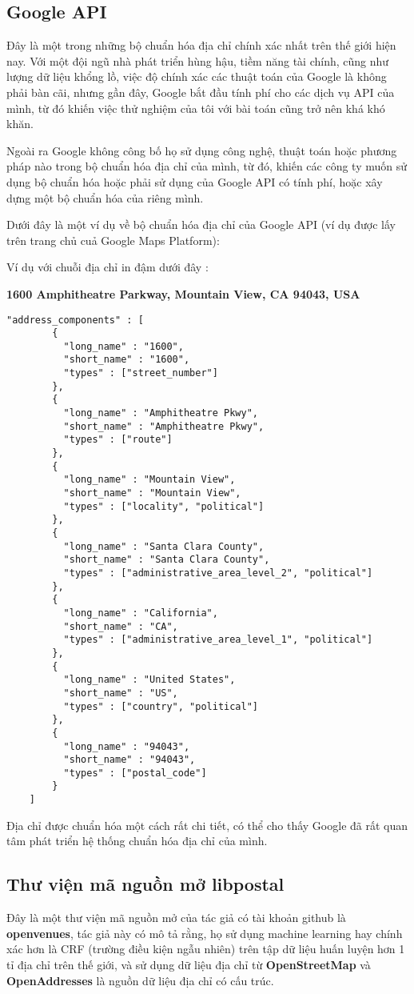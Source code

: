 \subsection{Google API}
 Đây là một trong những bộ chuẩn hóa địa chỉ chính xác nhất trên thế giới hiện nay. Với một đội ngũ nhà phát triển hùng hậu, tiềm năng tài chính, cũng như lượng dữ liệu khổng lồ, việc độ chính xác các thuật toán của Google là không phải bàn cãi, nhưng gần đây, Google bắt đầu tính phí cho các dịch vụ API của mình, từ đó khiến việc thử nghiệm của tôi với bài toán cũng trở nên khá khó khăn. 
 
 Ngoài ra Google không công bố họ sử dụng công nghệ, thuật toán hoặc phương pháp nào trong bộ chuẩn hóa địa chỉ của mình, từ đó, khiến các công ty muốn sử dụng bộ chuẩn hóa hoặc phải sử dụng của Google API có tính phí, hoặc xây dựng một bộ chuẩn hóa của riêng mình.
 
 Dưới đây là một ví dụ về bộ chuẩn hóa địa chỉ của Google API (ví dụ được lấy trên trang chủ cuả Google Maps Platform):
 
  \vspace*{1cm}
 Ví dụ với chuỗi địa chỉ in đậm dưới đây :
 
\textbf{1600 Amphitheatre Parkway, Mountain View, CA 94043, USA}
\newpage
\begin{lstlisting}
"address_components" : [
        {
          "long_name" : "1600",
          "short_name" : "1600",
          "types" : ["street_number"]
        },
        {
          "long_name" : "Amphitheatre Pkwy",
          "short_name" : "Amphitheatre Pkwy",
          "types" : ["route"]
        },
        {
          "long_name" : "Mountain View",
          "short_name" : "Mountain View",
          "types" : ["locality", "political"]
        },
        {
          "long_name" : "Santa Clara County",
          "short_name" : "Santa Clara County",
          "types" : ["administrative_area_level_2", "political"]
        },
        {
          "long_name" : "California",
          "short_name" : "CA",
          "types" : ["administrative_area_level_1", "political"]
        },
        {
          "long_name" : "United States",
          "short_name" : "US",
          "types" : ["country", "political"]
        },
        {
          "long_name" : "94043",
          "short_name" : "94043",
          "types" : ["postal_code"]
        }
    ]
\end{lstlisting}
Địa chỉ được chuẩn hóa một cách rất chi tiết, có thể cho thấy Google đã rất quan tâm phát triển hệ thống chuẩn hóa địa chỉ của mình.
\subsection{Thư viện mã nguồn mở libpostal}
Đây là một thư viện mã nguồn mở của tác giả có tài khoản github là \textbf{openvenues}, tác giả này có mô tả rằng, họ sử dụng machine learning hay chính xác hơn là CRF (trường điều kiện ngẫu nhiên) trên tập dữ liệu huấn luyện hơn 1 tỉ địa chỉ trên thế giới, và sử dụng dữ liệu địa chỉ từ \textbf{OpenStreetMap} và \textbf{OpenAddresses} là nguồn dữ liệu địa chỉ có cấu trúc.

